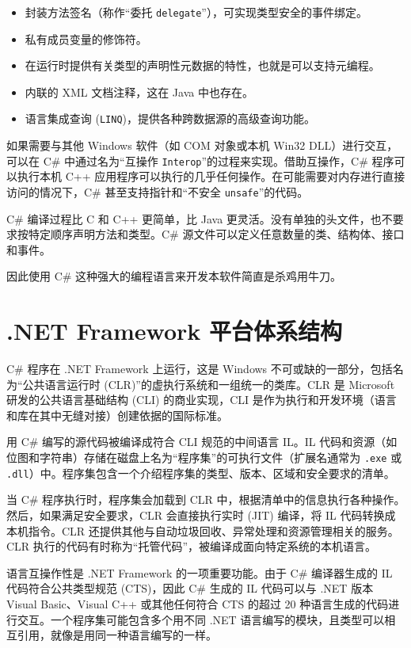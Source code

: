 \begin{itemize}
  \item 封装方法签名（称作``委托 \texttt{delegate}''），可实现类型安全的事件绑定。
  \item 私有成员变量的修饰符。
  \item 在运行时提供有关类型的声明性元数据的特性，也就是可以支持元编程。
  \item 内联的 XML 文档注释，这在 Java 中也存在。
  \item 语言集成查询 (\texttt{LINQ})，提供各种跨数据源的高级查询功能。
\end{itemize}

如果需要与其他 Windows 软件（如 COM 对象或本机 Win32 DLL）进行交互，可以在 C\# 中通过名为``互操作 \texttt{Interop}''的过程来实现。借助互操作，C\# 程序可以执行本机 C++ 应用程序可以执行的几乎任何操作。在可能需要对内存进行直接访问的情况下，C\# 甚至支持指针和``不安全 \texttt{unsafe}''的代码。

C\# 编译过程比 C 和 C++ 更简单，比 Java 更灵活。没有单独的头文件，也不要求按特定顺序声明方法和类型。C\# 源文件可以定义任意数量的类、结构体、接口和事件。

因此使用 C\# 这种强大的编程语言来开发本软件简直是杀鸡用牛刀。

\section{.NET Framework 平台体系结构}

C\# 程序在 .NET Framework 上运行，这是 Windows 不可或缺的一部分，包括名为``公共语言运行时 (CLR)''的虚执行系统和一组统一的类库。CLR 是 Microsoft 研发的公共语言基础结构 (CLI) 的商业实现，CLI 是作为执行和开发环境（语言和库在其中无缝对接）创建依据的国际标准。

用 C\# 编写的源代码被编译成符合 CLI 规范的中间语言 IL。IL 代码和资源（如位图和字符串）存储在磁盘上名为``程序集''的可执行文件（扩展名通常为 \texttt{.exe} 或 \texttt{.dll}）中。程序集包含一个介绍程序集的类型、版本、区域和安全要求的清单。

当 C\# 程序执行时，程序集会加载到 CLR 中，根据清单中的信息执行各种操作。然后，如果满足安全要求，CLR 会直接执行实时 (JIT) 编译，将 IL 代码转换成本机指令。CLR 还提供其他与自动垃圾回收、异常处理和资源管理相关的服务。CLR 执行的代码有时称为``托管代码''，被编译成面向特定系统的本机语言。

语言互操作性是 .NET Framework 的一项重要功能。由于 C\# 编译器生成的 IL 代码符合公共类型规范 (CTS)，因此 C\# 生成的 IL 代码可以与 .NET 版本 Visual Basic、Visual C++ 或其他任何符合 CTS 的超过 20 种语言生成的代码进行交互。一个程序集可能包含多个用不同 .NET 语言编写的模块，且类型可以相互引用，就像是用同一种语言编写的一样。

